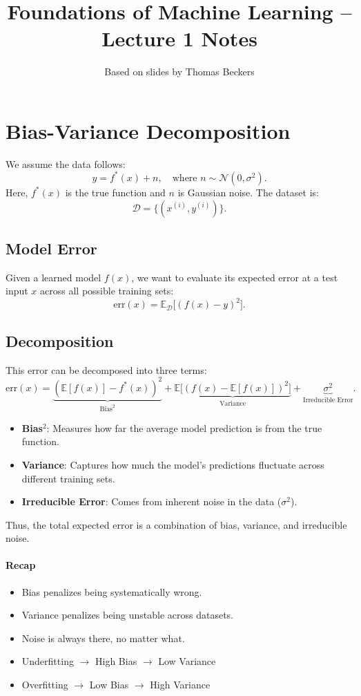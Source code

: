 \documentclass[11pt]{article}
\title{Foundations of Machine Learning -- Lecture 1 Notes}
\author{Based on slides by Thomas Beckers}
\date{}
\begin{document}
\maketitle

\section*{Bias-Variance Decomposition}

We assume the data follows:
\[
	y = f^*(x) + n, \quad \text{where } n \sim \mathcal{N}(0, \sigma^2).
\]
Here, $f^*(x)$ is the true function and $n$ is Gaussian noise.
The dataset is:
\[
	\mathcal{D} = \{ (x^{(i)}, y^{(i)}) \}.
\]

\subsection*{Model Error}
Given a learned model $f(x)$, we want to evaluate its expected error at a test input $x$ across all possible training sets:
\[
	\text{err}(x) = \mathbb{E}_{\mathcal{D}} \big[ (f(x) - y)^2 \big].
\]

\subsection*{Decomposition}
This error can be decomposed into three terms:
\[
	\text{err}(x) = \underbrace{(\mathbb{E}[f(x)] - f^*(x))^2}_{\text{Bias}^2}
	+ \underbrace{\mathbb{E}\big[(f(x) - \mathbb{E}[f(x)])^2\big]}_{\text{Variance}}
	+ \underbrace{\sigma^2}_{\text{Irreducible Error}}.
\]

\begin{itemize}
	\item \textbf{Bias$^2$}: Measures how far the average model prediction is from the true function.
	\item \textbf{Variance}: Captures how much the model’s predictions fluctuate across different training sets.
	\item \textbf{Irreducible Error}: Comes from inherent noise in the data ($\sigma^2$).
\end{itemize}

Thus, the total expected error is a combination of bias, variance, and irreducible noise.

\paragraph{Recap}
\begin{itemize}
	\item Bias penalizes being systematically wrong.
	\item Variance penalizes being unstable across datasets.
	\item Noise is always there, no matter what.
\end{itemize}

\begin{itemize}
  \item Underfitting $\rightarrow$ High Bias $\rightarrow$ Low Variance
  \item Overfitting $\rightarrow$ Low Bias $\rightarrow$ High Variance
\end{itemize}
\end{document}
